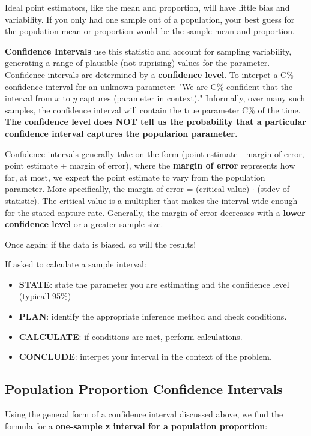 \documentclass[12pt, a4paper]{article}
\theoremstyle{definition}
\begin{document}
Ideal point estimators, like the mean and proportion, will have little bias and variability.
If you only had one sample out of a population, your best guess for the population mean or proportion would be the sample mean and proportion.

\textbf{Confidence Intervals} use this statistic and account for sampling variability, generating a range of plausible (not suprising) values for the parameter.
Confidence intervals are determined by a \textbf{confidence level}.
To interpet a C\% confidence interval for an unknown parameter: "We are C\% confident that the interval from $x$ to $y$ captures (parameter in context)."
Informally, over many such samples, the confidence interval will contain the true parameter C\% of the time.
\textbf{The confidence level does NOT tell us the probability that a particular confidence interval captures the popularion parameter.}

Confidence intervals generally take on the form (point estimate - margin of error, point estimate + margin of error), where the \textbf{margin of error} represents how far, at most, we expect the point estimate to vary from the population parameter.
More specifically, the margin of error = (critical value) $\cdot$ (stdev of statistic).
The critical value is a multiplier that makes the interval wide enough for the stated capture rate.
Generally, the margin of error decreases with a \textbf{lower confidence level} or a greater sample size.

Once again: if the data is biased, so will the results!

If asked to calculate a sample interval:
\begin{itemize}
    \item \textbf{STATE}: state the parameter you are estimating and the confidence level (typicall 95\%)
    \item \textbf{PLAN}: identify the appropriate inference method and check conditions.
    \item \textbf{CALCULATE}: if conditions are met, perform calculations.
    \item \textbf{CONCLUDE}: interpet your interval in the context of the problem. 
\end{itemize}

\subsection{Population Proportion Confidence Intervals}

Using the general form of a confidence interval discussed above, we find the formula for a \textbf{one-sample z interval for a population proportion}:
\end{document}
